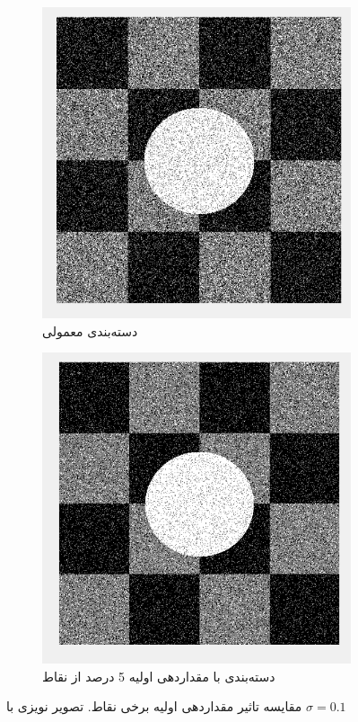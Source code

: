 \documentclass[11.5pt,a4paper]{article}
\begin{document}
\begin{figure}[h]
\center
	\begin{subfigure}{0.4\textwidth}
	\includegraphics[scale=0.3]{Imgs/MRF_S1_Init.png}
	\caption{دسته‌بندی معمولی}
	\end{subfigure}
	\begin{subfigure}{0.4\textwidth}
	\includegraphics[scale=0.3]{Imgs/MRF_S1_BetaV_Res.png}
	\caption{دسته‌بندی با مقداردهی اولیه 5 درصد از نقاط}
	\end{subfigure}	
\caption{مقایسه تاثیر مقداردهی اولیه برخی نقاط. تصویر نویزی با $\sigma=0.1$}
\label{fig:Init}
\end{figure}
\end{document}

